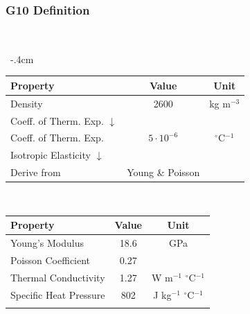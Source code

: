 \documentclass{amsdtx}
\begin{document}
\subsubsection{G10 Definition}
~\\[-3em]
\begin{table}[H]
\centering
\renewcommand{\arraystretch}{1.4}
~\kern-.4cm\begin{tabular}{l|c|c}
\bf Property & \bf Value & \bf Unit \\\hline\hline
Density & 2600 & kg m$^{-3}$ \\\hline
Coeff. of Therm. Exp. $\downarrow$ & & \\\hline
\quad Coeff. of Therm. Exp. & $5\cdot 10^{-6}$ & $^\circ$C$^{-1}$ \\\hline
Isotropic Elasticity $\downarrow$ & & \\\hline
\quad Derive from & Young \& Poisson & \\\hline
\end{tabular}~~~~~~
\begin{tabular}{l|c|c}
\bf Property & \bf Value & \bf Unit \\\hline\hline
\quad Young's Modulus & 18.6 & GPa \\\hline
\quad Poisson Coefficient & 0.27 & \\\hline
Thermal Conductivity & 1.27 & W m$^{-1}$ $^\circ$C$^{-1}$ \\\hline
Specific Heat Pressure & 802 & J kg$^{-1}$ $^\circ$C$^{-1}$\\\hline&&\\\hline
\end{tabular}
\end{table}
\newpage
\end{document}
